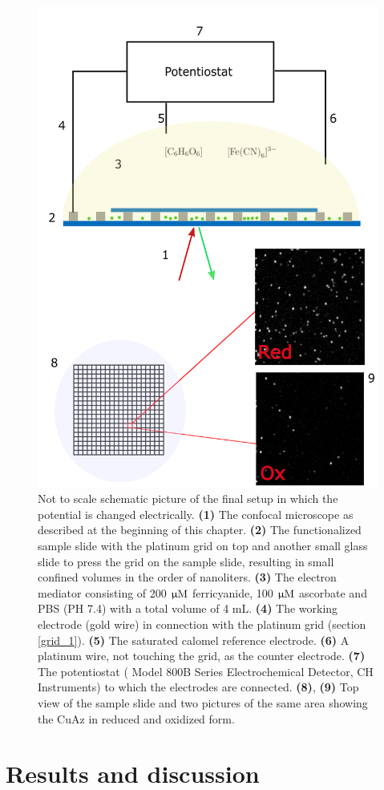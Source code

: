 \documentclass[twoside,single]{lion-msc}
\begin{document}
\begin{figure}[ht!]
\centering
\includegraphics[width=.75 \textwidth]{final_setup}
\caption{Not to scale schematic picture of the final setup in which the potential is changed electrically. \textbf{(1)} The confocal microscope as described at the beginning of this chapter. \textbf{(2)} The functionalized sample slide with the platinum grid on top and another small glass slide to press the grid on the sample slide, resulting in small confined volumes in the order of nanoliters. \textbf{(3)} The electron mediator consisting of 200 $\upmu \textup{M}$ ferricyanide, 100 $\upmu \textup{M}$ ascorbate and PBS (PH 7.4) with a total volume of 4 mL. \textbf{(4)} The working electrode (gold wire) in connection with the platinum grid (section \ref{grid_1}). \textbf{(5)} The saturated calomel reference electrode. \textbf{(6)} A platinum wire, not touching the grid, as the counter electrode. \textbf{(7)} The potentiostat ( Model 800B Series Electrochemical Detector, CH Instruments) to which the electrodes are connected. \textbf{(8)}, \textbf{(9)} Top view of the sample slide and two pictures of the same area showing the CuAz in reduced and oxidized form.}
\label{final_setup}
\end{figure}

\chapter{Results and discussion}
\end{document}
